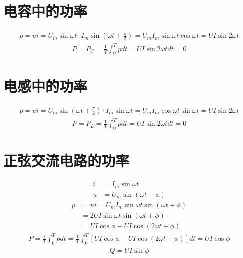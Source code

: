 \documentclass{ctexart}
\begin{document}
\newpage

\section{电容中的功率}
\begin{gather*}
p = ui = U_m\sin\omega t \cdot I_m\sin(\omega t + \frac{\pi}{2}) = U_{m}I_{m}\sin\omega t\cos\omega t = UI\sin2\omega t
\end{gather*}
\begin{gather*}
P = P_C = \frac{1}{T}\int_{0}^{T}pdt = UI\sin2\omega tdt = 0
\end{gather*}

\section{电感中的功率}
\begin{gather*}
p = ui = U_m\sin(\omega t + \frac{\pi}{2}) \cdot I_m\sin\omega t = U_{m}I_{m}\cos\omega t\sin\omega t = UI\sin2\omega t
\end{gather*}
\begin{gather*}
P = P_L = \frac{1}{T}\int_{0}^{T}pdt = UI\sin2\omega tdt = 0
\end{gather*}

\newpage

\section{正弦交流电路的功率}
\begin{align*}
i &= I_m\sin\omega t \\
u &= U_m\sin(\omega t + \phi)
\end{align*}
\begin{align*}
p &= ui = U_{m}I_{m}\sin\omega t\sin(\omega t + \phi) \\
  &= 2UI\sin\omega t\sin(\omega t + \phi) \\
  &= UI\cos\phi - UI\cos(2\omega t + \phi)
\end{align*}
\begin{gather*}
P = \frac{1}{T}\int_{0}^{T}pdt = \frac{1}{T}\int_{0}^{T}[UI\cos\phi - UI\cos(2\omega t + \phi)]dt = UI\cos\phi
\end{gather*}
\begin{gather*}
Q = UI\sin\phi
\end{gather*}
\end{document}
